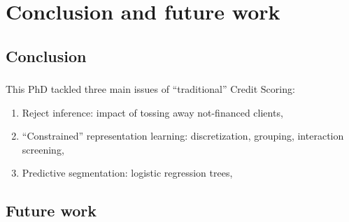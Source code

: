 \documentclass[english,xcolor={rgb,dvipsnames,table,usenames}]{beamer}
\begin{document}
\section{Conclusion and future work}

\subsection{Conclusion}

\begin{frame}
\frametitle{\subsecname}

This PhD tackled three main issues of ``traditional'' Credit Scoring:
\begin{enumerate}
\item Reject inference: impact of tossing away not-financed clients,

\medskip

\item<3-> ``Constrained'' representation learning: discretization, grouping, interaction screening,

\medskip

\item<5-> Predictive segmentation: logistic regression trees,

\medskip

\end{enumerate}

\end{frame}


\subsection{Future work}
\end{document}
